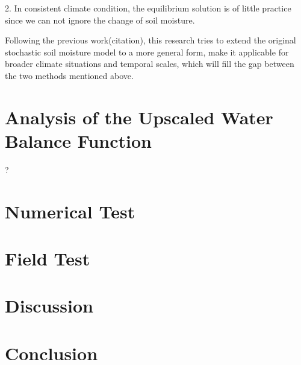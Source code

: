 \documentclass[11pt]{article}
\begin{document}
2. In consistent climate condition, the equilibrium solution is of little practice since we can not ignore the change of soil moisture.

Following the previous work(citation), this research tries to extend the original stochastic soil moisture model to a more general form, make it  applicable for broader climate situations and temporal scales, which will fill the gap between the two methods mentioned above.


\section{Analysis of the Upscaled Water Balance Function}


?
\section{Numerical Test}



\section{Field Test}


\section{Discussion}

\section{Conclusion}
\end{document}
